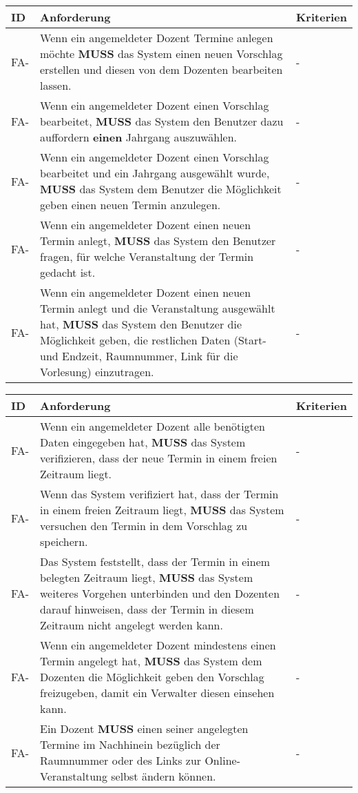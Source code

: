 \begin{tabular} {|p{}|p{11cm}|p{}|}
	\hline
	ID & Anforderung & Kriterien \\
	\hline
	FA-
	& Wenn ein angemeldeter Dozent Termine anlegen möchte \textbf{MUSS} das System einen neuen Vorschlag erstellen und diesen von dem Dozenten bearbeiten lassen.
	& - \\
	\hline
	FA-
	& Wenn ein angemeldeter Dozent einen Vorschlag bearbeitet, \textbf{MUSS} das System den Benutzer dazu auffordern \textbf{einen} Jahrgang auszuwählen. 
	& - \\
	\hline
	FA-
	& Wenn ein angemeldeter Dozent einen Vorschlag bearbeitet und ein Jahrgang ausgewählt wurde, \textbf{MUSS} das System dem Benutzer die Möglichkeit geben einen neuen Termin anzulegen.  
	& - \\
	\hline
	FA-
	& Wenn ein angemeldeter Dozent einen neuen Termin anlegt, \textbf{MUSS} das System den Benutzer fragen, für welche Veranstaltung der Termin gedacht ist.
	& - \\
	\hline
	FA-
	& Wenn ein angemeldeter Dozent einen neuen Termin anlegt und die Veranstaltung ausgewählt hat, \textbf{MUSS} das System den Benutzer die Möglichkeit geben, die restlichen Daten (Start- und Endzeit, Raumnummer, Link für die Vorlesung) einzutragen. 
	& - \\
	\hline
\end{tabular}
	
\begin{tabular} {|p{}|p{11cm}|p{}|}
	\hline
	ID & Anforderung & Kriterien \\
	\hline
	FA-
	& Wenn ein angemeldeter Dozent alle benötigten Daten eingegeben hat, \textbf{MUSS} das System verifizieren, dass der neue Termin in einem freien Zeitraum liegt.
	& - \\
	\hline
	FA-
	& Wenn das System verifiziert hat, dass der Termin in einem freien Zeitraum liegt, \textbf{MUSS} das System versuchen den Termin in dem Vorschlag zu speichern.
	& - \\
	\hline
	FA-
	& Das System feststellt, dass der Termin in einem belegten Zeitraum liegt, \textbf{MUSS} das System weiteres Vorgehen unterbinden und den Dozenten darauf hinweisen, dass der Termin in diesem Zeitraum nicht angelegt werden kann.
	& - \\
	\hline
	FA-
	& Wenn ein angemeldeter Dozent mindestens einen Termin angelegt hat, \textbf{MUSS} das System dem Dozenten die Möglichkeit geben den Vorschlag freizugeben, damit ein Verwalter diesen einsehen kann.
	& - \\
	\hline
	FA-
	& Ein Dozent \textbf{MUSS} einen seiner angelegten Termine im Nachhinein bezüglich der Raumnummer oder des Links zur Online-Veranstaltung selbst ändern können.
	& - \\
	\hline
\end{tabular}


